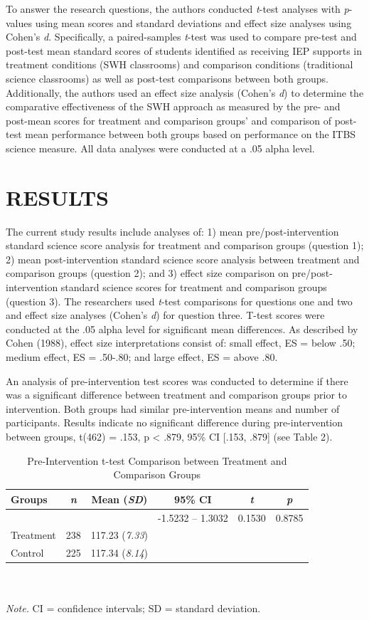 \documentclass[11.5pt]{sig-alternate} %
\begin{document}
\begin{large}
To answer the research questions, the authors conducted \textit{t}-test analyses with \textit{p}-values using mean scores and standard deviations and effect size analyses using Cohen’s \textit{d}.  Specifically, a paired-samples \textit{t}-test was used to compare pre-test and post-test mean standard scores of students identified as receiving IEP supports in treatment conditions (SWH classrooms) and comparison conditions (traditional science classrooms) as well as post-test comparisons between both groups.  Additionally, the authors used an effect size analysis (Cohen’s \textit{d}) to determine the comparative effectiveness of the SWH approach as measured by the pre- and post-mean scores for treatment and comparison groups’  and comparison of post-test mean performance between both groups based on performance on the ITBS science measure.  All data analyses were conducted at a .05 alpha level.

\section*{RESULTS}

The current study results include analyses of: 1) mean pre/post-intervention standard science score analysis for treatment and comparison groups (question 1); 2) mean post-intervention standard science score analysis between treatment and comparison groups (question 2); and 3) effect size comparison on pre/post-intervention standard science scores for treatment and comparison groups (question 3).  The researchers used \textit{t}-test comparisons for questions one and two and effect size analyses (Cohen’s \textit{d}) for question three. T-test scores were conducted at the .05 alpha level for significant mean differences.  As described by Cohen (1988), effect size interpretations consist of: small effect, ES = below .50; medium effect, ES = .50-.80; and large effect, ES = above .80.  

An analysis of pre-intervention test scores was conducted to determine if there was a significant difference between treatment and comparison groups prior to intervention.  Both groups had similar pre-intervention means and number of participants.  Results indicate no significant difference during pre-intervention between groups, t(462) = .153, p < .879, 95\% CI [.153, .879] (see Table 2).

\begin{table}[th]
\caption{Pre-Intervention t-test Comparison between Treatment and Comparison Groups}
\begin{tabular}{lccccc}
\hline
Groups & \textit{n} & Mean (\textit{SD}) & 95\% CI & \textit{t} & \textit{p} \\ \hline
 &  &  & -1.5232 – 1.3032 & 0.1530 & 0.8785 \\
Treatment & 238 & 117.23 (\textit{7.33}) &  &  & \\
Control & 225 & 117.34 (\textit{8.14}) &  &  & \\ \hline
\end{tabular}
\\ \\ \textit{Note.} CI = confidence intervals; SD = standard deviation.
\end{table}


\end{large}
\end{document}
